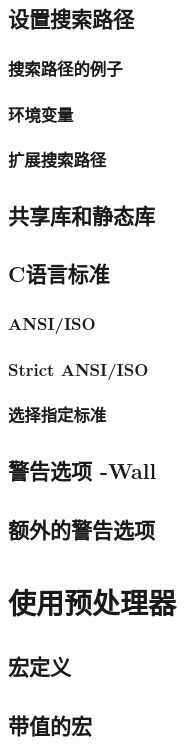 \documentclass[lang=cn,12pt,newtx,scheme=chinese]{elegantbook}
\begin{document}
\section{设置搜索路径}
\subsection{搜索路径的例子}
\subsection{环境变量}
\subsection{扩展搜索路径}
\section{共享库和静态库}
\section{C语言标准}
\subsection{ANSI/ISO}
\subsection{Strict ANSI/ISO}
\subsection{选择指定标准}
\section{警告选项 -Wall}
\section{额外的警告选项}

\chapter{使用预处理器}
\section{宏定义}
\section{带值的宏}
\end{document}
